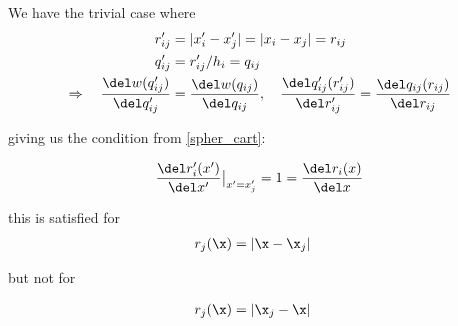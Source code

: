 We have the trivial case where
\begin{align*}
	r'_{ij} &= |x_i' - x_j'| = | x_i - x_j | = r_{ij} \\
	q'_{ij} &= r'_{ij}/h_i = q_{ij} \\
	\Rightarrow \quad \frac{\del w(q'_{ij})}{\del q'_{ij}} &= \frac{\del w(q_{ij})}{\del q_{ij}}, \quad \frac{\del q'_{ij}(r'_{ij})}{\del r'_{ij}} = \frac{\del q_{ij}(r_{ij})}{\del r_{ij}}
\end{align*}



giving us the condition from \ref{spher_cart}:






\begin{equation}
	\frac{\del r'_{i}(x')}{\del x'}	  \big{|}_{x' = x_j' } = 1 = \frac{\del r_{i}(x)}{\del x}
\end{equation}


this is satisfied for
\begin{align*}
	r_j(\x) &= | \x - \x_j |
\end{align*}

but not for

\begin{align*}
	r_j(\x) &= | \x_j - \x |
\end{align*}















